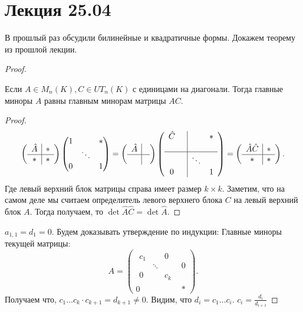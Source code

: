 \section{Лекция 25.04}
\begin{motivation}
    В прошлый раз обсудили билинейные и квадратичные формы.
    Докажем теорему из прошлой лекции.
\end{motivation}
\begin{proof}
    \begin{lemma}
        Если $A\in M_n(K), C\in UT_n(K)$ с единицами на диагонали. Тогда главные миноры
        $A$ равны главным минорам матрицы $AC$.
    \end{lemma}
    \begin{proof}
        \[
        \left(\begin{array}{c|c}
                \hat{A} & * \\
                \hline
                 *& *
        \end{array}\right)
        \begin{pmatrix}
            1 & & *\\
              &\ddots&\\
            0 & & 1
        \end{pmatrix} =
        \left(\begin{array}{c|c}
                \hat{A} & \\
                \hline
                 & 
        \end{array}\right)
        \left(\begin{array}{cc|cc}
                \hat{C} & & &* \\
                & & & \\
                \hline
                &&\ddots&\\
                0&&&1
        \end{array}\right)=
        \left(\begin{array}{c|c}
                \hat{A} \hat{C} & * \\
                \hline
                 * & *
        \end{array}\right)
        .\] 
        Где левый верхний блок матрицы справа имеет размер $k\times k$.
        Заметим, что на самом деле мы считаем определитель левого верхнего блока $C$ на левый верхний блок $A$.
        Тогда получаем, то  $\det \hat{A} \hat{C} = \det \hat{A}$.
    \end{proof}
    $a_{1,1} = d_1 = 0$.
    Будем доказывать утверждение по индукции:
    Главные миноры текущей матрицы:
    \[
    A = 
    \left(\begin{array}{c|c}
            \begin{array}{ccc}
                c_1 & & 0\\
                    &\ddots&\\
                0&&c_k
            \end{array} & 0 \\
            \hline
              0 & *
    \end{array}\right)
    .\] 
    Получаем что, $c_1\dots c_k \cdot c_{k + 1} = d_{k + 1}\not=0$.
    Видим, что $d_i = c_1\dots c_i$.  $c_i = \frac{d_i}{d_{i + 1}}$
\end{proof}
